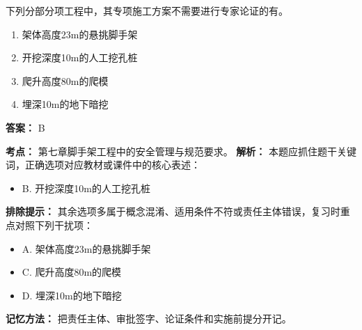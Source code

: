 \documentclass[UTF8,fontset=fandol,11pt]{ctexart}
\begin{document}
\begin{quizbox}[title={第 3 题}]
下列分部分项工程中，其专项施工方案不需要进行专家论证的有。\\
\begin{enumerate}[label=\Alph*.]
\item 架体高度23m的悬挑脚手架
\item 开挖深度10m的人工挖孔桩
\item 爬升高度80m的爬模
\item 埋深10m的地下暗挖
\end{enumerate}
\textbf{答案：} B
\vspace{0.25em}
\begin{answerbox}[title={考点解析}]
\textbf{考点：} 第七章脚手架工程中的安全管理与规范要求。
\textbf{解析：} 本题应抓住题干关键词，正确选项对应教材或课件中的核心表述：
\begin{itemize}
\item B. 开挖深度10m的人工挖孔桩
\end{itemize}
\textbf{排除提示：} 其余选项多属于概念混淆、适用条件不符或责任主体错误，复习时重点对照下列干扰项：
\begin{itemize}
\item A. 架体高度23m的悬挑脚手架
\item C. 爬升高度80m的爬模
\item D. 埋深10m的地下暗挖
\end{itemize}
\textbf{记忆方法：} 把责任主体、审批签字、论证条件和实施前提分开记。
\end{answerbox}
\end{quizbox}

\vspace{0.2em}
\end{document}
